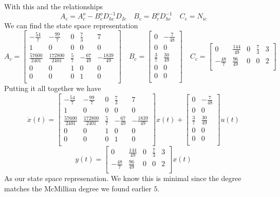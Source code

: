 \documentclass{article}
\begin{document}
With this and the relationships
$$ A_c = A_c^o - B_c^o D_{hc}^{-1}D_{Ic} \quad B_c = B_c^oD_{hc}^{-1} \quad C_c = N_{ic} $$
We can find the state space representation
$$
A_c =
\begin{bmatrix}
-\frac{54}{7} & -\frac{99}{7} & 0 & \frac{7}{3} & 7 \\
1 & 0 & 0 & 0 & 0 \\
\frac{57600}{2401} & \frac{172800}{2401} & \frac{5}{7} & -\frac{67}{49} & -\frac{1839}{49} \\
0 & 0 & 1 & 0 & 0 \\
0 & 0 & 0 & 1 & 0 \\
\end{bmatrix}
\quad
B_c =
\begin{bmatrix}
0 & -\frac{7}{48} \\
0 & 0 \\
\frac{3}{7} & \frac{30}{49} \\
0 & 0 \\
0 & 0 \\
\end{bmatrix}
\quad
C_c =
\begin{bmatrix}
0 & \frac{144}{49} & 0 & \frac{7}{3} & 3 \\
-\frac{48}{7} & \frac{96}{49} & 0 & 0 & 2 \\
\end{bmatrix}
$$
Putting it all together we have
$$
\dot{x}(t) =
\begin{bmatrix}
-\frac{54}{7} & -\frac{99}{7} & 0 & \frac{7}{3} & 7 \\
1 & 0 & 0 & 0 & 0 \\
\frac{57600}{2401} & \frac{172800}{2401} & \frac{5}{7} & -\frac{67}{49} & -\frac{1839}{49} \\
0 & 0 & 1 & 0 & 0 \\
0 & 0 & 0 & 1 & 0 \\
\end{bmatrix}
x(t) +
\begin{bmatrix}
0 & -\frac{7}{48} \\
0 & 0 \\
\frac{3}{7} & \frac{30}{49} \\
0 & 0 \\
0 & 0 \\
\end{bmatrix}
u(t)
$$
$$
y(t) =
\begin{bmatrix}
0 & \frac{144}{49} & 0 & \frac{7}{3} & 3 \\
-\frac{48}{7} & \frac{96}{49} & 0 & 0 & 2 \\
\end{bmatrix}
x(t)
$$
As our state space represenation.
We know this is minimal since the degree matches the McMillian degree we found earlier $5$.
\end{document}
